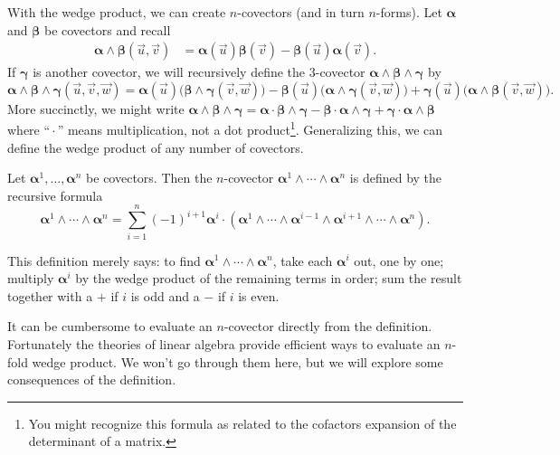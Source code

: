 With the wedge product, we can create $n$-covectors (and in turn
$n$-forms).  Let $\bm\alpha$ and $\bm \beta$ be covectors and recall
\begin{align*}
	\bm\alpha\wedge \bm\beta (\vec u,\vec v) &= \bm\alpha(\vec u)\bm\beta(\vec v)
	-\bm\beta(\vec u)\bm\alpha(\vec v).
\end{align*}
If $\bm\gamma$ is another covector, we will recursively define the 3-covector
$\bm\alpha \wedge \bm \beta\wedge\bm\gamma$ by
\[
	\bm\alpha \wedge \bm \beta\wedge\bm\gamma(\vec u,\vec v,\vec w)
	=  \bm\alpha(\vec u)\big(\bm\beta\wedge \bm\gamma (\vec v,\vec w)\big)
	- \bm\beta(\vec u)\big(\bm\alpha\wedge \bm\gamma (\vec v,\vec w)\big)
	+ \bm\gamma(\vec u)\big(\bm\alpha\wedge \bm\beta (\vec v,\vec w)\big).
\]
More succinctly, we might write
$
	\bm\alpha \wedge \bm \beta\wedge\bm\gamma
	=  \bm\alpha\cdot \bm\beta\wedge \bm\gamma
	- \bm\beta\cdot \bm\alpha\wedge \bm\gamma
	+ \bm\gamma\cdot \bm\alpha\wedge \bm\beta
$ where ``\,$\cdot$\,'' means multiplication, not a dot product\footnote{
You might recognize this formula as related to the cofactors expansion
of the determinant of a matrix.
}.  Generalizing this, we can define the wedge product of any number
of covectors.

\begin{definition}
	Let $\bm\alpha^1,\ldots, \bm\alpha^n$ be covectors.  Then the
	$n$-covector $\bm\alpha^1\wedge\cdots \wedge \bm\alpha^n$ is defined by
	the recursive formula
	\[
		\bm\alpha^1\wedge\cdots \wedge \bm\alpha^n
		=\sum_{i=1}^n (-1)^{i+1} \bm\alpha^i\cdot (\bm\alpha^1\wedge \cdots \wedge 
		\bm\alpha^{i-1}\wedge \bm\alpha^{i+1}\wedge \cdots \wedge \bm\alpha^n).
	\]
\end{definition}
This definition merely says: to find $\bm\alpha^1\wedge\cdots \wedge \bm\alpha^n$,
take each $\bm\alpha^i$ out, one by one; multiply $\bm\alpha^i$ by the wedge
product of the remaining terms in order; sum the result together with a $+$
if $i$ is odd and a $-$ if $i$ is even.

It can be cumbersome to evaluate an $n$-covector directly from the definition.
Fortunately the theories of linear algebra provide
efficient ways to evaluate an $n$-fold
wedge product.  We won't go through them here, but we will explore
some consequences of the definition.

